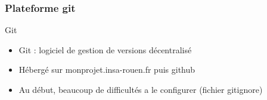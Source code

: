 
\begin{frame}
    \frametitle{Plateforme git}
    		\begin{block}{Git}
    			\begin{itemize}
    				\item Git : logiciel de gestion de versions décentralisé
    				\item Hébergé sur monprojet.insa-rouen.fr puis github
    				\item Au début, beaucoup de difficultés a le configurer (fichier gitignore) 
    			\end{itemize}
    		\end{block}
  

\end{frame}